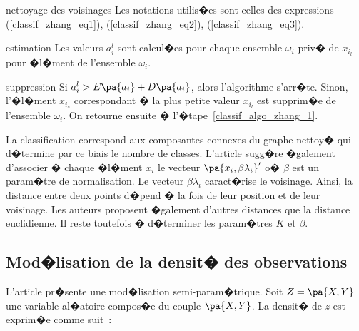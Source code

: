             \begin{xalgorithm}{nettoyage des voisinages}
            Les notations utilis�es sont celles des expressions (\ref{classif_zhang_eq1}), 
            (\ref{classif_zhang_eq2}), (\ref{classif_zhang_eq3}).
            
            \begin{xalgostep}{estimation}\label{classif_algo_zhang_1}
            Les valeurs $a_i^l$ sont calcul�es pour chaque ensemble $\omega_i$ priv� de $x_{i_l}$ pour �l�ment
            de l'ensemble $\omega_i$.
            \end{xalgostep}

            \begin{xalgostep}{suppression}
            Si $a_i^l > E\pa{a_i} + D\pa{a_i}$, alors l'algorithme s'arr�te. Sinon, l'�l�ment $x_{i_s}$ correspondant
            � la plus petite valeur $x_{i_l}$ est supprim�e de l'ensemble $\omega_i$. 
            On retourne ensuite � l'�tape~\ref{classif_algo_zhang_1}.
            \end{xalgostep}
            
            \end{xalgorithm}



La classification correspond aux composantes connexes du graphe nettoy� qui d�termine par ce biais le nombre de classes. L'article sugg�re �galement d'associer � chaque �l�ment $x_i$ le vecteur $\pa{x_i, \beta \lambda_i}'$ o� $\beta$ est un param�tre de normalisation. Le vecteur $\beta \lambda_i$ caract�rise le voisinage. Ainsi, la distance entre deux points d�pend � la fois de leur position et de leur voisinage. Les auteurs proposent �galement d'autres distances que la distance euclidienne. Il reste toutefois � d�terminer les param�tres $K$ et $\beta$. 





\subsection{Mod�lisation de la densit� des observations}


\label{classification_modelisation_densite}

L'article  pr�sente une mod�lisation semi-param�trique. Soit $Z = \pa{X,Y}$ une variable al�atoire compos�e du couple $\pa{X,Y}$. La densit� de $z$ est exprim�e comme suit~:

